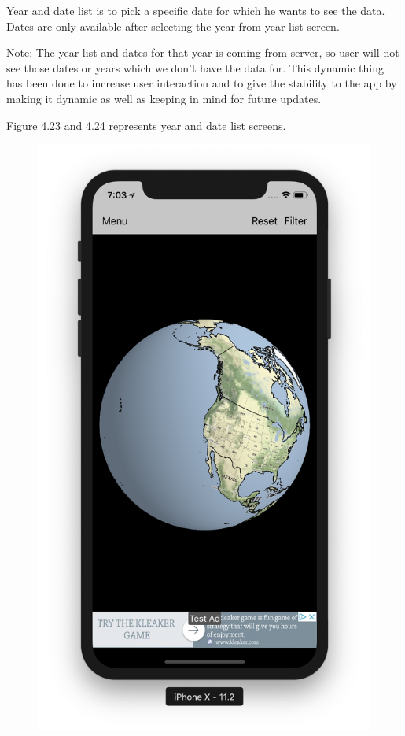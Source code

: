 \begin{itemize}
    Year and date list is to pick a specific date for which he wants to see the data. Dates are only available after selecting the year from year list screen.
    
    Note: The year list and dates for that year is coming from server, so user will not see those dates or years which we don't have the data for.
    This dynamic thing has been done to increase user interaction and to give the stability to the app by making it dynamic as well as keeping in mind for future updates.
    
    
    Figure 4.23 and 4.24 represents year and date list screens.
    
    \begin{figure}[!htb]
        \begin{minipage}{0.5\textwidth}
            \centering
            \includegraphics[width=0.8\linewidth]{figures/ch4/home_globe.png}

\end{minipage}
\end{figure}
\end{itemize}
